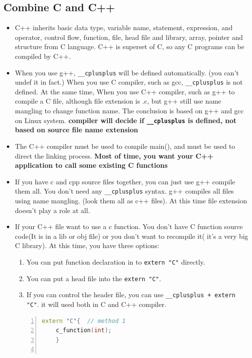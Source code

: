 \documentclass[a4paper,11pt,twoside]{book}
\begin{document}
\subsection{Combine C and C++}
\begin{itemize}
	
	\item C++ inherits basic data type, variable name, statement, expression, and operator, control flow, function, file, head file and library, array, pointer and structure from C language. C++ is superset of C, so any C programs can be compiled by C++.
	
	\item When you use g++,  \texttt{\_\_cplusplus} will be defined automatically. (you can't undef it in fact.) When you use C compiler, such as gcc, \texttt{\_\_cplusplus} is not defined. At the same time, When you use C++ compiler, such as g++ to compile a C file, although file extension is .c, but g++ still use name mangling to change function name.  The conclusion is based on g++ and gcc on Linux system. \textbf{compiler will decide if \texttt{\_\_cplusplus} is defined, not based on source file name extension}
	
	\item The C++ compiler must be used to compile main(), and must be used to direct the linking process. \textbf{Most of time, you want your C++ application to call some existing C functions}
	
	\item If you have c and cpp source files together, you can just use g++ compile them all. You don't need any \texttt{\_\_cplusplus} syntax.  g++ compiles all files using name mangling. (look them all as c++ files). At this time file extension doesn't play a role at all.
	
	\item If your C++ file want to use a c function. You don't have C function source code(It is in a lib or obj file) or you don't want to recompile it( it's a very big C library). At this time, you have three options:
	
	\begin{enumerate}
		\item You can put function declaration in to \texttt{extern "C"} directly.
		\item You can put a head file into the \texttt{extern "C"}.
		\item If you can control the header file, you can use \texttt{\_\_cplusplus + extern "C"}. it will used both in C and C++ compiler.
	\end{enumerate}
	\begin{lstlisting}[frame=single, language=c++, numbers=left,
	stepnumber=1, xleftmargin=2em, framexleftmargin=1.9em]
	extern "C"{  // method 1
	c_function(int);
	}
	

\end{lstlisting}
\end{itemize}
\end{document}
